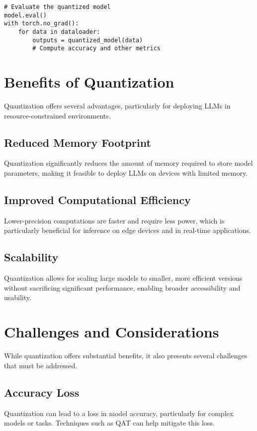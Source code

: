 \begin{verbatim}
# Evaluate the quantized model
model.eval()
with torch.no_grad():
    for data in dataloader:
        outputs = quantized_model(data)
        # Compute accuracy and other metrics
\end{verbatim}

\section{Benefits of Quantization}
Quantization offers several advantages, particularly for deploying LLMs in resource-constrained environments.

\subsection{Reduced Memory Footprint}
Quantization significantly reduces the amount of memory required to store model parameters, making it feasible to deploy LLMs on devices with limited memory.

\subsection{Improved Computational Efficiency}
Lower-precision computations are faster and require less power, which is particularly beneficial for inference on edge devices and in real-time applications.

\subsection{Scalability}
Quantization allows for scaling large models to smaller, more efficient versions without sacrificing significant performance, enabling broader accessibility and usability.

\section{Challenges and Considerations}
While quantization offers substantial benefits, it also presents several challenges that must be addressed.

\subsection{Accuracy Loss}
Quantization can lead to a loss in model accuracy, particularly for complex models or tasks. Techniques such as QAT can help mitigate this loss.

